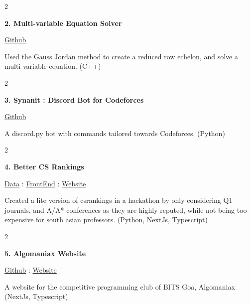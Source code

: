 \documentclass[10pt, letterpaper]{article}
\newenvironment{twocolentry}[2][]{
    \onecolentry
    \def\secondColumn{#2}
    \setcolumnwidth{\fill, 4.7 cm} %
    \begin{paracol}{2}
}{
    \switchcolumn \raggedleft \secondColumn
    \end{paracol}
    \endonecolentry
}
\begin{document}
        \vspace{0.4 cm} %

        \begin{twocolentry}{
            \href{https://github.com/Darelife/MultiEquationSolver}{Github}
        }
            \textbf{2. Multi-variable Equation Solver}
        \end{twocolentry}

        \vspace{0.15 cm} %
        Used the Gauss Jordan method to create a reduced row echelon, and solve a multi variable equation. (C++)

        \vspace{0.4 cm} %

        \begin{twocolentry}{
            \href{https://github.com/Darelife/synanit2.0}{Github}
        }
            \textbf{3. Synanit : Discord Bot for Codeforces}
        \end{twocolentry}

        \vspace{0.15 cm} %
        A discord.py bot with commands tailored towards Codeforces. (Python)

        \vspace{0.4 cm} %

        \begin{twocolentry}{%
            \href{https://github.com/Darelife/HackenzaHackathon}{Data} : 
            \href{https://github.com/arin-r/better-csrankings}{FrontEnd} : 
            \href{https://better-csrankings.vercel.app/}{Website}%
        }
            \textbf{4. Better CS Rankings}
        \end{twocolentry}

        \vspace{0.15 cm} %
        Created a lite version of csrankings in a hackathon by only considering Q1 journals, and A/A* conferences as they are highly reputed, while not being too expensive for south asian professors. (Python, NextJs, Typescript)

        \vspace{0.4 cm} %

        \begin{twocolentry}{
            \href{https://github.com/Darelife/AlgoXXX}{Github} : \href{https://algomaniax.vercel.app/}{Website}
        }
            \textbf{5. Algomaniax Website}
        \end{twocolentry}

        \vspace{0.15 cm} %
        A website for the competitive programming club of BITS Goa, Algomaniax (NextJs, Typescript)

        \vspace{0.4 cm} %
\end{document}
